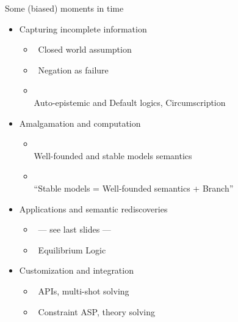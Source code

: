 \begin{frame}{Some (biased) moments in time}
  \smallskip
  \begin{itemize}
  \item<1-> Capturing incomplete information
    \begin{itemize}
    \item<only@2->  \ Closed world assumption
    \item<only@2->  \ Negation as failure
    \item<only@2-> \\ Auto-epistemic and Default logics, Circumscription
    \end{itemize}
  \item<1-> Amalgamation and computation
    \begin{itemize}
    \item<only@3-> \\ Well-founded and stable models semantics
    \item<only@3-> \\ ``Stable models = Well-founded semantics + Branch''
    \end{itemize}
  \item<1-> Applications and semantic rediscoveries
    \begin{itemize}
    \item<only@4->  \ --- see last slides ---
    \item<only@4->    \ Equilibrium Logic
    \end{itemize}
  \item<1-> Customization and integration
    \begin{itemize}
    \item <only@5->  \ APIs, multi-shot solving
    \item <only@5->  \ Constraint ASP, theory solving
    \end{itemize}
  \end{itemize}
\end{frame}
%
